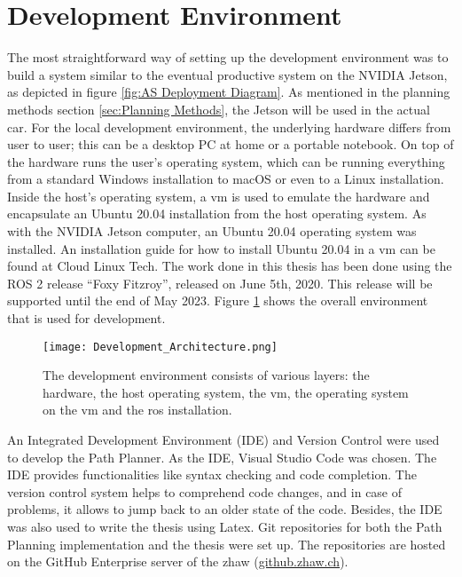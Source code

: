 \section{Development Environment} \label{sec:Development Environment}
The most straightforward way of setting up the development environment was to build a system similar to the eventual productive system on the NVIDIA Jetson, as depicted in figure \ref{fig:AS Deployment Diagram}.
As mentioned in the planning methods section \ref{sec:Planning Methods}, the Jetson will be used in the actual car.
For the local development environment, the underlying hardware differs from user to user; this can be a desktop PC at home or a portable notebook. On top of the hardware runs the user's operating system, which can be running everything from a standard Windows installation to macOS or even to a Linux installation. Inside the host's operating system, a \acrlong{vm} is used to emulate the hardware and encapsulate an Ubuntu 20.04 installation from the host operating system. As with the NVIDIA Jetson computer, an Ubuntu 20.04 operating system was installed. An installation guide for how to install Ubuntu 20.04 in a \acrshort{vm} can be found at Cloud Linux Tech. \cite{cloudlinuxtech_install_ubuntu_2004} The work done in this thesis has been done using the ROS 2 release ``Foxy Fitzroy'', released on June 5th, 2020. This release will be supported until the end of May 2023. \cite{ros2_releases_and_target_platforms}
Figure \ref{fig:Development Environment} shows the overall environment that is used for development.
\begin{figure}[H]
    \centering
    \texttt{[image: Development\_Architecture.png]}
    \caption{The development environment consists of various layers: the hardware, the host operating system, the \acrshort{vm}, the operating system on the \acrshort{vm} and the \acrshort{ros} installation.}
    \label{fig:Development Environment}
\end{figure}

An Integrated Development Environment (IDE) and Version Control were used to develop the Path Planner. As the IDE, Visual Studio Code was chosen. The IDE provides functionalities like syntax checking and code completion. The version control system helps to comprehend code changes, and in case of problems, it allows to jump back to an older state of the code. Besides, the IDE was also used to write the thesis using Latex. Git repositories for both the Path Planning implementation and the thesis were set up. The repositories are hosted on the GitHub Enterprise server of the \acrshort{zhaw} (\href{https://github.zhaw.ch}{github.zhaw.ch}).

